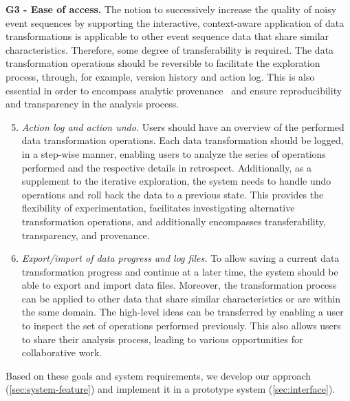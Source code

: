 \documentclass[camera]{vgtc}                          %
\begin{document}
\vspace{-4pt}
\noindent
\textbf{G3 - Ease of access.} 
The notion to successively increase the quality of noisy event sequences by supporting the interactive, context-aware application of data transformations is applicable to other event sequence data that share similar characteristics. Therefore, some degree of transferability is required. The data transformation operations should be reversible to facilitate the exploration process, through, for example, version history and action log. This is also essential in order to encompass analytic provenance~\cite{North2011Analytic, Xu2020Survey} and ensure reproducibility and transparency in the analysis process.
\begin{enumerate}
    \setcounter{enumi}{4}
    \itemsep0em
    \vspace{-4pt}
    \item \textit{Action log and action undo.} Users should have an overview of the performed data transformation operations. Each data transformation should be logged, in a step-wise manner, enabling users to analyze the series of operations performed and the respective details in retrospect. Additionally, as a supplement to the iterative exploration, the system needs to handle undo operations and roll back the data to a previous state. This provides the flexibility of experimentation, facilitates investigating alternative transformation operations, and additionally encompasses transferability, transparency, and provenance.

    \vspace{-4pt}
    \item \textit{Export/import of data progress and log files.} To allow saving a current data transformation progress and continue at a later time, the system should be able to export and import data files. Moreover, the transformation process can be applied to other data that share similar characteristics or are within the same domain. The high-level ideas can be transferred by enabling a user to inspect the set of operations performed previously. This also allows users to share their analysis process, leading to various opportunities for collaborative work.
\end{enumerate}
Based on these goals and system requirements, we develop our approach (\autoref{sec:system-feature}) and implement it in a prototype system (\autoref{sec:interface}).



\vspace{-4pt}
\end{document}
